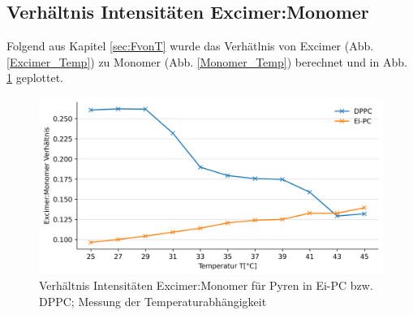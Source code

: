 \subsection{Verhältnis Intensitäten Excimer:Monomer}\label{sec:Ex_Mono}
Folgend aus Kapitel \ref{sec:FvonT} wurde das Verhätlnis von Excimer (Abb. \ref{Excimer_Temp}) zu Monomer (Abb. \ref{Monomer_Temp}) berechnet und in Abb. \ref{Ex_Mono} geplottet.

\begin{figure}[h!]
	\begin{center}
		\begin{minipage}{0,8\textwidth}
			
			\includegraphics[width=\textwidth]{picture/Ex_Mono.png}
			\caption{Verhältnis Intensitäten Excimer:Monomer für Pyren in Ei-PC bzw. DPPC; Messung der Temperaturabhängigkeit} 
			\label{Ex_Mono} 
		\end{minipage}
	\end{center}
\end{figure}

